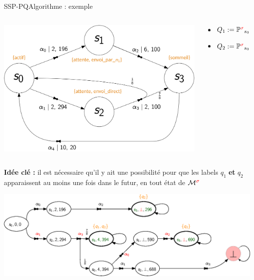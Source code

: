 \documentclass[compress]{beamer}
\theoremstyle{theorem}%
\begin{document}
\begin{frame}{SSP-PQ}{Algorithme : exemple}
    \begin{columns}
      \begin{column}{0.3\linewidth}
        \includegraphics[width=\linewidth]{resources/mdmdp2}
      \end{column}
      \begin{column}{0.7\linewidth}{\small
        \begin{itemize}
          \item $Q_1 := \mathbb{P}^{\color{red}\sigma}_{s_0}(\Diamond_{1\, :\, \leq 4} \text{ sommeil}) \geq 0.8$
          \item $Q_2 := \mathbb{P}^{\color{red}\sigma}_{s_0}(\Diamond_{2\, :\, \leq 700} \text{ sommeil}) \geq 0.9$
        \end{itemize}
        }
      \end{column}
    \end{columns}
  \vspace{0.04\linewidth}
  {\small \textbf{\color{fibeamer@orange}Idée clé : } il est nécessaire qu'il y ait une possibilité pour que les labels {\color{DarkOrange}$q_1$} \textbf{et} {\color{DarkOrange}$q_2$} apparaissent au moins une fois dans le futur, en tout état de $\mathcal{M}^{\color{red}\sigma}$}
  \vspace{-0.02\linewidth}
  \begin{center}
    \includegraphics[width=\linewidth]{resources/SSP-PQ-unfolding}
  \end{center}
\end{frame}
\end{document}
